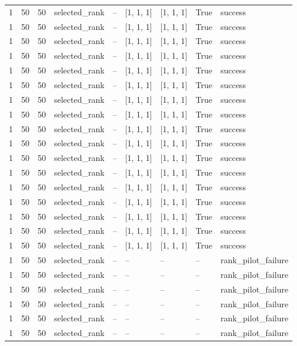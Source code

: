\begin{longtable}{lllllllll}
1 & 50 & 50 & selected\_rank & -- & [1, 1, 1] & [1, 1, 1] & True & success \\
1 & 50 & 50 & selected\_rank & -- & [1, 1, 1] & [1, 1, 1] & True & success \\
1 & 50 & 50 & selected\_rank & -- & [1, 1, 1] & [1, 1, 1] & True & success \\
1 & 50 & 50 & selected\_rank & -- & [1, 1, 1] & [1, 1, 1] & True & success \\
1 & 50 & 50 & selected\_rank & -- & [1, 1, 1] & [1, 1, 1] & True & success \\
1 & 50 & 50 & selected\_rank & -- & [1, 1, 1] & [1, 1, 1] & True & success \\
1 & 50 & 50 & selected\_rank & -- & [1, 1, 1] & [1, 1, 1] & True & success \\
1 & 50 & 50 & selected\_rank & -- & [1, 1, 1] & [1, 1, 1] & True & success \\
1 & 50 & 50 & selected\_rank & -- & [1, 1, 1] & [1, 1, 1] & True & success \\
1 & 50 & 50 & selected\_rank & -- & [1, 1, 1] & [1, 1, 1] & True & success \\
1 & 50 & 50 & selected\_rank & -- & [1, 1, 1] & [1, 1, 1] & True & success \\
1 & 50 & 50 & selected\_rank & -- & [1, 1, 1] & [1, 1, 1] & True & success \\
1 & 50 & 50 & selected\_rank & -- & [1, 1, 1] & [1, 1, 1] & True & success \\
1 & 50 & 50 & selected\_rank & -- & [1, 1, 1] & [1, 1, 1] & True & success \\
1 & 50 & 50 & selected\_rank & -- & [1, 1, 1] & [1, 1, 1] & True & success \\
1 & 50 & 50 & selected\_rank & -- & [1, 1, 1] & [1, 1, 1] & True & success \\
1 & 50 & 50 & selected\_rank & -- & [1, 1, 1] & [1, 1, 1] & True & success \\
1 & 50 & 50 & selected\_rank & -- & -- & -- & -- & rank\_pilot\_failure \\
1 & 50 & 50 & selected\_rank & -- & -- & -- & -- & rank\_pilot\_failure \\
1 & 50 & 50 & selected\_rank & -- & -- & -- & -- & rank\_pilot\_failure \\
1 & 50 & 50 & selected\_rank & -- & -- & -- & -- & rank\_pilot\_failure \\
1 & 50 & 50 & selected\_rank & -- & -- & -- & -- & rank\_pilot\_failure \\
1 & 50 & 50 & selected\_rank & -- & -- & -- & -- & rank\_pilot\_failure \\

\end{longtable}
